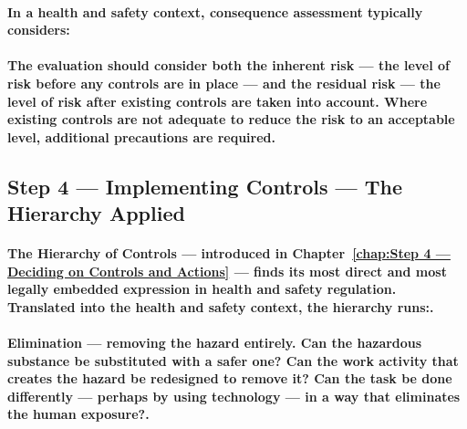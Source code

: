 \paragraph{In a health and safety context, consequence assessment typically considers:}
\begin{itemize}
\end{itemize}
\paragraph{The evaluation should consider both the inherent risk — the level of risk before any controls are in place — and the residual risk — the level of risk after existing controls are taken into account. Where existing controls are not adequate to reduce the risk to an acceptable level, additional precautions are required.}

\subsection{Step 4 — Implementing Controls — The Hierarchy Applied}
\paragraph{The \textbf{Hierarchy of Controls} — introduced in Chapter~\ref{chap:Step 4 — Deciding on Controls and Actions} — finds its most direct and most legally embedded expression in health and safety regulation. Translated into the health and safety context, the hierarchy runs:.}
\paragraph{\textbf{Elimination} — removing the hazard entirely. Can the hazardous substance be substituted with a safer one? Can the work activity that creates the hazard be redesigned to remove it? Can the task be done differently — perhaps by using technology — in a way that eliminates the human exposure?.}

